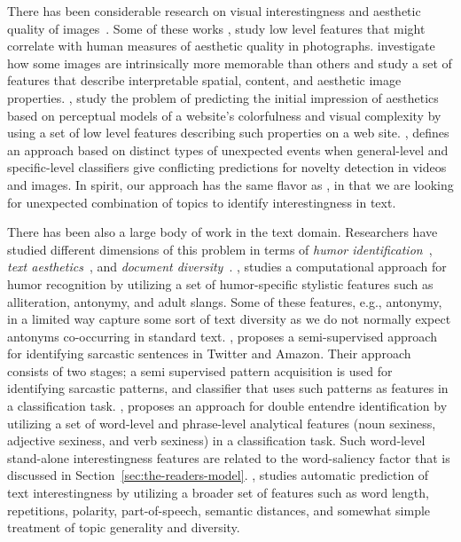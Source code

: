 There has been considerable research on visual interestingness and aesthetic quality of images~\cite{Datta:2006:SAP:2129560.2129588,Datta:2008:4233023,Ke:2006:DHF:1153170.1153495,IsolaParikhTorralbaOliva2011,dhar:2011,reinecke2013predicting,journals/pami/WeinshallZHKOABGNPHP12}. Some of these works \cite{Datta:2006:SAP:2129560.2129588,Datta:2008:4233023,Ke:2006:DHF:1153170.1153495,dhar:2011}, study low level features that might correlate with human measures of aesthetic quality in photographs. \cite{IsolaParikhTorralbaOliva2011} investigate how some images are intrinsically more memorable than others and study a set of features that describe interpretable spatial, content, and aesthetic image properties. \cite{reinecke2013predicting,journals/pami/WeinshallZHKOABGNPHP12},  study the problem of predicting the initial impression of aesthetics
based on perceptual models of a website's colorfulness and visual complexity by using a set of low level features describing such properties on a web site.  
\cite{journals/pami/WeinshallZHKOABGNPHP12}, defines an approach based on distinct types of unexpected events when general-level and specific-level classifiers give conflicting predictions for novelty detection in videos and images. In spirit, our approach has the same flavor as \cite{journals/pami/WeinshallZHKOABGNPHP12},  in that we are looking for unexpected combination of topics to identify interestingness in text.

 
There has been also a large body of work in the text domain. Researchers have studied different dimensions of this problem in terms of {\em humor identification}~\cite{Mihalcea:2005:MCL:1220575.1220642,Davidov:2010:SRS:1870568.1870582,Kiddon11,labutov-lipson:2012:ACL2012short},
{\em text aesthetics}~\cite{journals:tamd:Schmidhuber10,N13-1118,ganguly:2014}, and {\em document diversity}~\cite{bache:2013}.  \cite{Mihalcea:2005:MCL:1220575.1220642}, studies a computational approach for humor recognition by utilizing a set of humor-specific stylistic features such as alliteration, antonymy, and adult slangs. Some of these features, e.g., antonymy, in a limited way capture some sort of text diversity as we do not normally expect antonyms co-occurring in standard text. \cite{Davidov:2010:SRS:1870568.1870582},  proposes a semi-supervised approach for identifying sarcastic sentences
in Twitter and Amazon.  Their approach consists of two stages; a semi supervised pattern acquisition is used for identifying
sarcastic patterns, and classifier that uses such patterns as features in a classification task. \cite{Kiddon11}, proposes an approach for double entendre identification by utilizing  a set of word-level and phrase-level analytical features (noun sexiness, adjective sexiness, and verb sexiness) in a classification task. Such word-level stand-alone interestingness features are related to the word-saliency factor that is discussed in Section~\ref{sec:the-readers-model}. \cite{ganguly:2014}, studies automatic prediction of text interestingness by utilizing a broader set of features such as word length, repetitions, polarity, part-of-speech, semantic distances, and somewhat simple treatment of topic generality and diversity.

